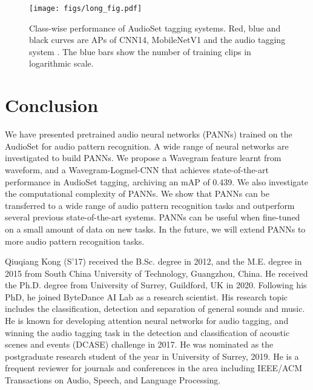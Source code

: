 \documentclass[journal]{IEEEtran}
\begin{document}
\begin{figure*}[t!]
  \centering
  \centerline{\texttt{[image: figs/long\_fig.pdf]}}
  \caption{Class-wise performance of AudioSet tagging systems. Red, blue and black curves are APs of CNN14, MobileNetV1 and the audio tagging system \cite{kong2019weakly}. The blue bars show the number of training clips in logarithmic scale.}
  \label{fig:long_fig}
\end{figure*}


\section{Conclusion}\label{section:conclusion}
We have presented pretrained audio neural networks (PANNs) trained on the AudioSet for audio pattern recognition. A wide range of neural networks are investigated to build PANNs. We propose a Wavegram feature learnt from waveform, and a Wavegram-Logmel-CNN that achieves state-of-the-art performance in AudioSet tagging, archiving an mAP of 0.439. We also investigate the computational complexity of PANNs. We show that PANNs can be transferred to a wide range of audio pattern recognition tasks and outperform several previous state-of-the-art systems. PANNs can be useful when fine-tuned on a small amount of data on new tasks. In the future, we will extend PANNs to more audio pattern recognition tasks. 





\ifCLASSOPTIONcaptionsoff
  \newpage
\fi























\begin{IEEEbiography}{Qiuqiang Kong}
(S'17) received the B.Sc. degree in 2012, and the M.E. degree in 2015 from South China University of Technology, Guangzhou, China. He received the Ph.D. degree from University of Surrey, Guildford, UK in 2020. Following his PhD, he joined ByteDance AI Lab as a research scientist. His research topic includes the classification, detection and separation of general sounds and music. He is known for developing attention neural networks for audio tagging, and winning the audio tagging task in the detection and classification of acoustic scenes and events (DCASE) challenge in 2017. He was nominated as the postgraduate research student of the year in University of Surrey, 2019. He is a frequent reviewer for journals and conferences in the area including IEEE/ACM Transactions on Audio, Speech, and Language Processing.
\end{IEEEbiography}
\end{document}
